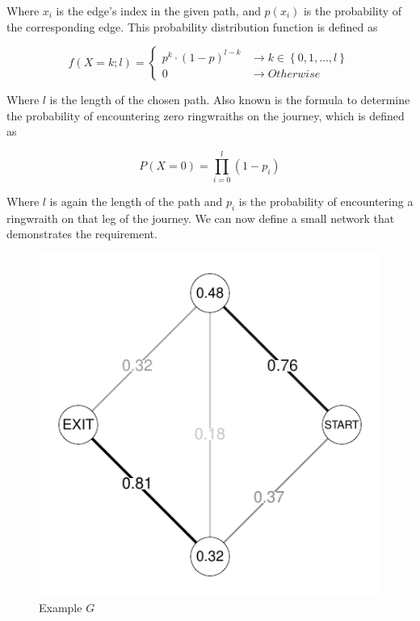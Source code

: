 \documentclass[10pt]{article}\usepackage[]{graphicx}\usepackage[]{xcolor}
\makeatletter
\def\maxwidth{ %
  \ifdim\Gin@nat@width>\linewidth
    \linewidth
  \else
    \Gin@nat@width
  \fi
}
\newenvironment{knitrout}{}{} %
\makeatother
\begin{document}
\begin{easylist}[enumerate]
    Where $x_i$ is the edge's index in the given path, and $p(x_i)$ is the probability of the corresponding edge. This
    probability distribution function is defined as

    \[
        f(X = k; l) =
        \begin{cases}
            p^k \cdot (1 - p)^{l - k} &\to k \in \left\{ 0, 1, \ldots, l \right\}\\
            0 &\to Otherwise
        \end{cases}
    \]

    Where $l$ is the length of the chosen path. Also known is the formula to determine the probability of encountering
    zero ringwraiths on the journey, which is defined as

    \[
        P(X=0) = \prod^l_{i=0} (1 - p_i)
    \]

    Where $l$ is again the length of the path and $p_i$ is the probability of encountering a ringwraith on that leg of
    the journey. We can now define a small network that demonstrates the requirement.

\begin{knitrout}
\color{fgcolor}\begin{figure}[H]


{\centering \includegraphics[width=\maxwidth]{figure/ps8_2a} 

}

\caption[Example $G$]{Example $G$\label{fig:ps8.2a}}
\end{figure}



\end{knitrout}
\end{easylist}
\end{document}
